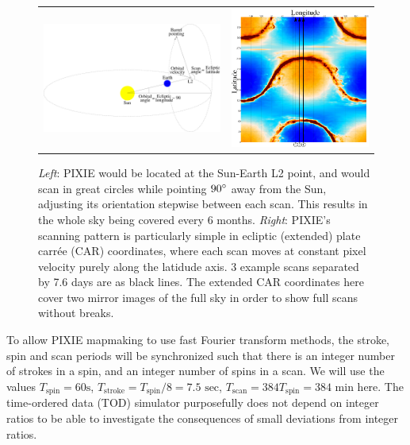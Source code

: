 \documentclass{article}
\begin{document}
\begin{figure}
	\centering
	\begin{tabular}{m{90mm}m{70mm}}
		\includegraphics[width=90mm]{plots/scan_orbit.pdf} &
		\includegraphics[width=70mm]{plots/scan_car.pdf}
	\end{tabular}
	\caption{\emph{Left}: PIXIE would be located at the Sun-Earth L2 point,
	and would scan in great circles while pointing $90\degree$ away from the
	Sun, adjusting its orientation stepwise between each scan. This results
	in the whole sky being covered every 6 months. \emph{Right}: PIXIE's
	scanning pattern is particularly simple in ecliptic (extended) plate carrée (CAR)
	coordinates, where each scan moves at constant pixel velocity purely along the
	latidude axis. 3 example scans separated by 7.6 days are as black lines.
	The extended CAR coordinates here cover two mirror images of the full sky
	in order to show full scans without breaks.}
\end{figure}

To allow PIXIE mapmaking to use fast Fourier transform methods, the stroke, spin
and scan periods will be synchronized such that there is an integer number of
strokes in a spin, and an integer number of spins in a scan. We will use the
values $T_\textrm{spin} = 60 \textrm{s}$, $T_\textrm{stroke} = T_\textrm{spin}/8 =
7.5 \textrm{ sec}$, $T_\textrm{scan} = 384 T_\textrm{spin} = 384 \textrm{ min}$ here.
The time-ordered data (TOD) simulator purposefully does not depend on integer ratios to be able
to investigate the consequences of small deviations from integer ratios.
\end{document}
